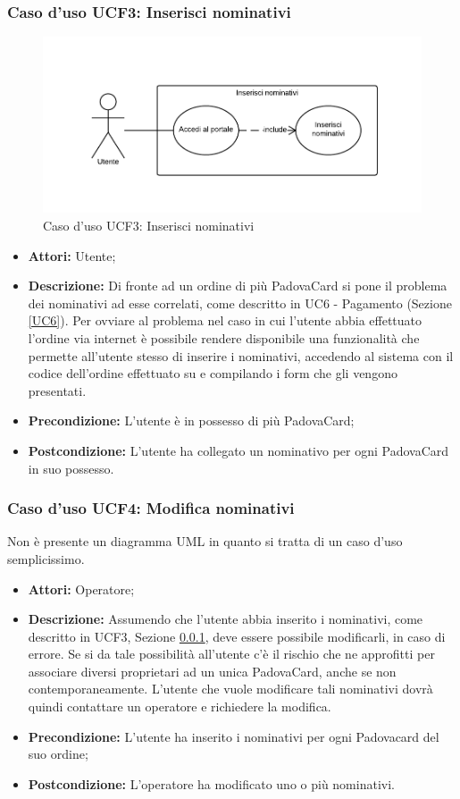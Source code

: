 \subsubsection{Caso d'uso UCF3: Inserisci nominativi}\label{UCF3}

\begin{figure}[H]
\centering
\includegraphics[width=1\textwidth]{images/UCF3.png}
\caption{Caso d'uso UCF3: Inserisci nominativi}
\end{figure}
\begin{itemize}
\item \textbf{Attori:} Utente;
\item \textbf{Descrizione:} Di fronte ad un ordine di più PadovaCard si pone il problema dei nominativi ad esse correlati, come descritto in UC6 - Pagamento (Sezione \ref{UC6}). Per ovviare al problema nel caso in cui l'utente abbia effettuato l'ordine via internet è possibile rendere disponibile una funzionalità che permette all'utente stesso di inserire i nominativi, accedendo al sistema con il codice dell'ordine effettuato su \vivaticket e compilando i form che gli vengono presentati.
\item \textbf{Precondizione:} L'utente è in possesso di più PadovaCard;
\item \textbf{Postcondizione:}  L'utente ha collegato un nominativo per ogni PadovaCard in suo possesso.
\end{itemize}

\subsubsection{Caso d'uso UCF4: Modifica nominativi}
Non è presente un diagramma UML in quanto si tratta di un caso d'uso semplicissimo.
\begin{itemize}
\item \textbf{Attori:} Operatore;
\item \textbf{Descrizione:} Assumendo che l'utente abbia inserito i nominativi, come descritto in UCF3, Sezione \ref{UCF3}, deve essere possibile modificarli, in caso di errore. Se si da tale possibilità all'utente c'è il rischio che ne approfitti per associare diversi proprietari ad un unica PadovaCard, anche se non contemporaneamente. 
L'utente che vuole modificare tali nominativi dovrà quindi contattare un operatore e richiedere la modifica.
\item \textbf{Precondizione:} L'utente ha inserito i nominativi per ogni Padovacard del suo ordine;
\item \textbf{Postcondizione:} L'operatore ha modificato uno o più nominativi.
\end{itemize}

